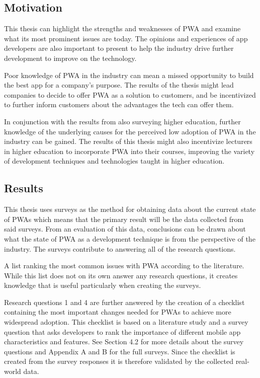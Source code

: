 \documentclass[a4paper,12pt]{article}
\begin{document}
\subsection{Motivation}
This thesis can highlight the strengths and weaknesses of PWA and examine what its most prominent issues are today. The opinions and experiences of app developers are also important to present to help the industry drive further development to improve on the technology.  

Poor knowledge of PWA in the industry can mean a missed opportunity to build the best app for a company’s purpose. The results of the thesis might lead companies to decide to offer PWA as a solution to customers, and be incentivized to further inform customers about the advantages the tech can offer them.

In conjunction with the results from also surveying higher education, further knowledge of the underlying causes for the perceived low adoption of PWA in the industry can be gained. The results of this thesis might also incentivize lecturers in higher education to incorporate PWA into their courses, improving the variety of development techniques and technologies taught in higher education.

\subsection{Results}
This thesis uses surveys as the method for obtaining data about the current state of PWAs which means that the primary result will be the data collected from said surveys. From an evaluation of this data, conclusions can be drawn about what the state of PWA as a development technique is from the perspective of the industry. The surveys contribute to answering all of the research questions.

A list ranking the most common issues with PWA according to the literature. While this list does not on its own answer any research questions, it creates knowledge that is useful particularly when creating the surveys.

Research questions 1 and 4 are further answered by the creation of a checklist containing the most important changes needed for PWAs to achieve more widespread adoption. This checklist is based on a literature study and a survey question that asks developers to rank the importance of different mobile app characteristics and features. See Section 4.2 for more details about the survey questions and Appendix A and B for the full surveys. Since the checklist is created from the survey responses it is therefore validated by the collected real-world data.
\end{document}
